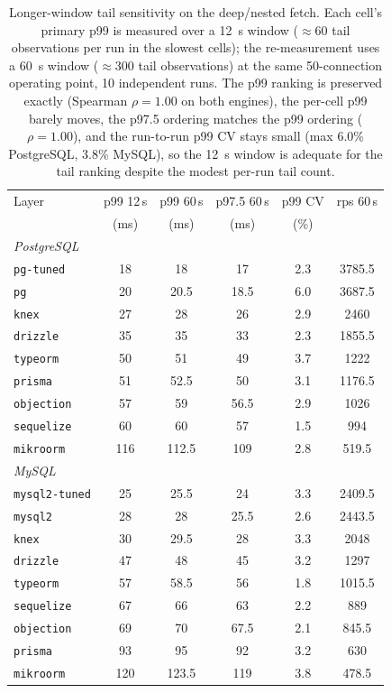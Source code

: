 \begin{table}[htbp]
  \centering
  \small
  \caption{Longer-window tail sensitivity on the deep/nested fetch. Each cell's primary p99 is
    measured over a 12~s window ($\approx$60 tail observations per run in the slowest
    cells); the re-measurement uses a 60~s window ($\approx$300 tail observations) at the
    same 50-connection operating point, 10 independent runs. The p99 ranking is preserved
    exactly (Spearman $\rho=1.00$ on both engines), the per-cell p99 barely moves, the
    p97.5 ordering matches the p99 ordering ($\rho=1.00$), and the run-to-run p99 CV stays
    small (max 6.0\% PostgreSQL, 3.8\% MySQL),
    so the 12~s window is adequate for the tail ranking despite the modest per-run tail count.}
  \label{tab:taillong}
  \begin{tabular}{l ccccc}
    \toprule
    Layer & p99 12\,s & p99 60\,s & p97.5 60\,s & p99 CV & rps 60\,s \\
     & (ms) & (ms) & (ms) & (\%) & \\
    \midrule
    \multicolumn{6}{l}{\emph{PostgreSQL}} \\
    \quad\texttt{pg-tuned} & 18 & 18 & 17 & 2.3 & 3785.5 \\
    \quad\texttt{pg} & 20 & 20.5 & 18.5 & 6.0 & 3687.5 \\
    \quad\texttt{knex} & 27 & 28 & 26 & 2.9 & 2460 \\
    \quad\texttt{drizzle} & 35 & 35 & 33 & 2.3 & 1855.5 \\
    \quad\texttt{typeorm} & 50 & 51 & 49 & 3.7 & 1222 \\
    \quad\texttt{prisma} & 51 & 52.5 & 50 & 3.1 & 1176.5 \\
    \quad\texttt{objection} & 57 & 59 & 56.5 & 2.9 & 1026 \\
    \quad\texttt{sequelize} & 60 & 60 & 57 & 1.5 & 994 \\
    \quad\texttt{mikroorm} & 116 & 112.5 & 109 & 2.8 & 519.5 \\
    \multicolumn{6}{l}{\emph{MySQL}} \\
    \quad\texttt{mysql2-tuned} & 25 & 25.5 & 24 & 3.3 & 2409.5 \\
    \quad\texttt{mysql2} & 28 & 28 & 25.5 & 2.6 & 2443.5 \\
    \quad\texttt{knex} & 30 & 29.5 & 28 & 3.3 & 2048 \\
    \quad\texttt{drizzle} & 47 & 48 & 45 & 3.2 & 1297 \\
    \quad\texttt{typeorm} & 57 & 58.5 & 56 & 1.8 & 1015.5 \\
    \quad\texttt{sequelize} & 67 & 66 & 63 & 2.2 & 889 \\
    \quad\texttt{objection} & 69 & 70 & 67.5 & 2.1 & 845.5 \\
    \quad\texttt{prisma} & 93 & 95 & 92 & 3.2 & 630 \\
    \quad\texttt{mikroorm} & 120 & 123.5 & 119 & 3.8 & 478.5 \\
    \bottomrule
  \end{tabular}
\end{table}
